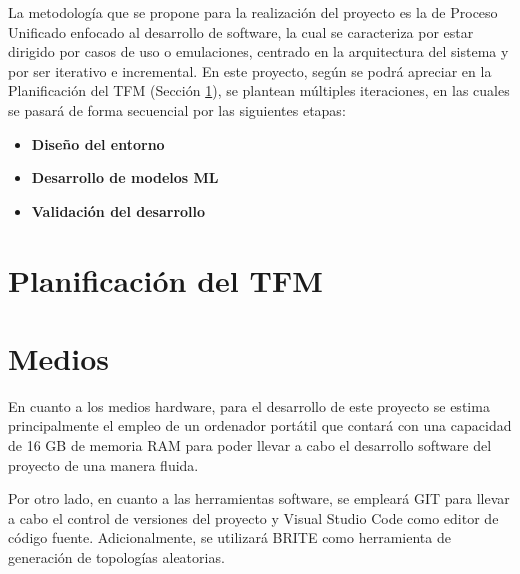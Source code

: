 \vspace{0.3cm}

La metodología que se propone para la realización del proyecto es la de Proceso Unificado enfocado al desarrollo de software, la cual se caracteriza por estar dirigido por casos de uso o emulaciones, centrado en la arquitectura del sistema y por ser iterativo e incremental. En este proyecto, según se podrá apreciar en la Planificación del TFM (Sección \ref{sec:planificacion}), se plantean múltiples iteraciones, en las cuales se pasará de forma secuencial por las siguientes etapas:

\begin{itemize}
    \item \textbf{Diseño del entorno} 
    \item \textbf{Desarrollo de modelos ML}
    \item \textbf{Validación del desarrollo}
\end{itemize}

\vspace{0.3cm}

\section{Planificación del TFM}
\label{sec:planificacion}


\section{Medios}

\vspace{0.3cm}
En cuanto a los medios hardware, para el desarrollo de este proyecto se estima principalmente el empleo de un ordenador portátil que contará con una capacidad de 16 GB de memoria RAM para poder llevar a cabo el desarrollo software del proyecto de una manera fluida.

\vspace{0.3cm}
Por otro lado, en cuanto a las herramientas software, se empleará GIT \cite{git} para llevar a cabo el control de versiones del proyecto y Visual Studio Code \cite{visual} como editor de código fuente. Adicionalmente, se utilizará BRITE como herramienta de generación de topologías aleatorias.

\newpage
